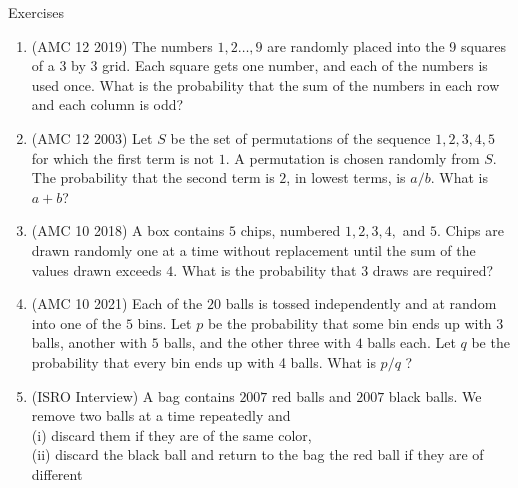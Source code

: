 \begin{xcb}{Exercises}
\begin{enumerate}
\begin{hint}
\end{hint}
\item (AMC 12 2019)  The numbers $1,2 \dots ,9$ are randomly placed into the 9 squares of a 3 by 3 grid. Each square gets one number, and each of the numbers is used once. What is the probability that the sum of the numbers in each row and each column is odd?\\
\begin{hint}
\end{hint}
\item (AMC 12 2003)  Let $S$ be the set of permutations of the sequence $1, 2, 3, 4, 5$ for which the first term is not $1$. A permutation is chosen randomly from $S$. The probability that the second term is $2$, in lowest terms, is $a/b$. What is $a + b$?
\item (AMC 10 2018)  A box contains $5$ chips, numbered $1, 2, 3, 4,$ and $5$. Chips are drawn randomly one at a time without replacement until the sum of the values drawn exceeds $4$. What is the probability that $3$ draws are required?
\begin{hint}
\end{hint}
\item (AMC 10 2021)  Each of the $20$ balls is tossed independently and at random into one of the $5$ bins. Let $p$ be the probability that some bin ends up with $3$ balls, another with $5$ balls, and the other three with $4$ balls each. Let $q$ be the probability that every bin ends up with 4 balls. What is $p/q$ ?
\begin{hint}
\end{hint}
\item (ISRO Interview)  A bag contains $2007$ red balls and $2007$ black balls. We remove two balls
at a time repeatedly and\\
(i) discard them if they are of the same color,\\
(ii) discard the black ball and return to the bag the red ball if they are of different

\end{enumerate}
\end{xcb}
